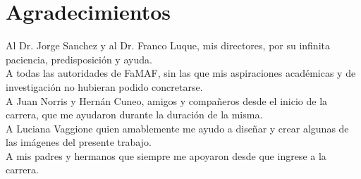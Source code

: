 \newpage
\section*{Agradecimientos}

	\begin{minipage}{0.9\textwidth}
	Al Dr. Jorge Sanchez y al Dr. Franco Luque, mis directores, por su infinita paciencia, predisposición y ayuda.\\
	A todas las autoridades de FaMAF, sin las que mis aspiraciones académicas y de investigación no hubieran podido concretarse.	\\
	A Juan Norris y Hernán Cuneo, amigos y compañeros desde el inicio de la carrera, que me ayudaron durante la duración de la misma. \\
	A Luciana Vaggione quien amablemente me ayudo a diseñar y crear algunas de las imágenes del presente trabajo. \\
    A mis padres y hermanos que siempre me apoyaron desde que ingrese a la carrera.
	\end{minipage}
